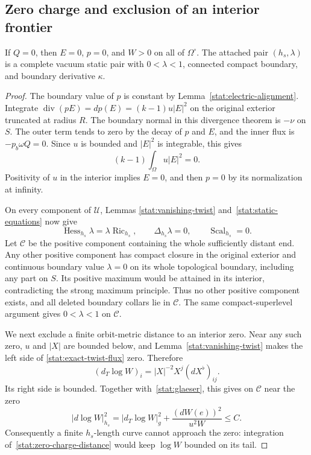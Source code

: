 \subsection{Zero charge and exclusion of an interior frontier}

\begin{proposition}
\label{stat:zero-charge-positivity}
If $Q=0$, then $E=0$, $p=0$, and $W>0$ on all of
$\Omega^\circ$.  The attached pair $(h_s,\lambda)$ is a complete
vacuum static pair with $0<\lambda<1$, connected compact boundary,
and boundary derivative $\kappa$.
\end{proposition}

\begin{proof}
The boundary value of $p$ is constant by
Lemma~\ref{stat:electric-alignment}.  Integrate
$\operatorname{div}(pE)=dp(E)=(k-1)u|E|^2$ on the original
exterior truncated at radius $R$.  The boundary normal in this
divergence theorem is $-\nu$ on $S$.  The outer term tends to zero
by the decay of $p$ and $E$, and the inner flux is
$-p_b\omega Q=0$.  Since $u$ is bounded and $|E|^2$ is integrable,
this gives
\[
 (k-1)\int_\Omega u|E|^2=0.
\]
Positivity of $u$ in the interior implies $E=0$, and then $p=0$ by
its normalization at infinity.

On every component of $\mathcal U$, Lemmas
\ref{stat:vanishing-twist} and~\ref{stat:static-equations} now give
\begin{equation}
 \operatorname{Hess}_{h_s}\lambda
     =\lambda\operatorname{Ric}_{h_s},\qquad
 \Delta_{h_s}\lambda=0,
 \qquad \operatorname{Scal}_{h_s}=0.
 \label{stat:local-vacuum}
\end{equation}
Let $\mathcal C$ be the positive component containing the whole
sufficiently distant end.  Any other positive component has compact
closure in the original exterior and continuous boundary value
$\lambda=0$ on its whole topological boundary, including any part
on $S$.  Its positive maximum would be attained in its interior,
contradicting the strong maximum principle.  Thus no other positive
component exists, and all deleted boundary collars lie in
$\mathcal C$.  The same compact-superlevel argument gives
$0<\lambda<1$ on $\mathcal C$.

We next exclude a finite orbit-metric distance to an interior
zero.  Near any such zero, $u$ and $|X|$ are bounded below, and
Lemma~\ref{stat:vanishing-twist} makes the left side of
\eqref{stat:exact-twist-flux} zero.  Therefore
\begin{equation}
 (d_T\log W)_i=|X|^{-2}X^j(dX^\flat)_{ij}.
 \label{stat:zero-charge-transverse-log}
\end{equation}
Its right side is bounded.  Together with~\eqref{stat:glaeser},
this gives on $\mathcal C$ near the zero
\begin{equation}
 |d\log W|_{h_s}^2
 =|d_T\log W|_g^2
      +\frac{(dW(e))^2}{u^2W}\leq C.
 \label{stat:zero-charge-distance}
\end{equation}
Consequently a finite $h_s$-length curve cannot approach the zero:
integration of~\eqref{stat:zero-charge-distance} would keep
$\log W$ bounded on its tail.


\end{proof}
